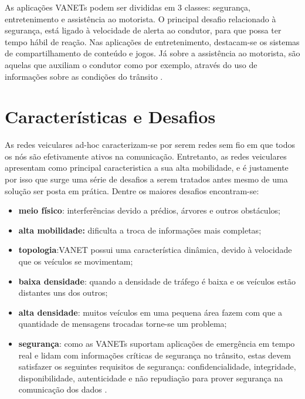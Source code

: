 \documentclass[
	12pt,				%
	oneside,			%
	a4paper,			%
	english,			%
	brazil				%
	]{abntex2ppgsi}
\begin{document}
As aplicações VANETs podem ser divididas em 3 classes: segurança, entretenimento e assistência ao motorista. O principal desafio relacionado à segurança, está ligado à velocidade de alerta ao condutor, para que possa ter tempo hábil de reação. Nas aplicações de entretenimento, destacam-se os sistemas de compartilhamento de conteúdo e jogos. Já sobre a assistência ao motorista, são aquelas que auxiliam o condutor como por exemplo, através do uso de informações sobre as condições do trânsito \cite{souzasoaressbrc}.

\section{Características e Desafios}


As redes veiculares ad-hoc caracterizam-se por serem redes sem fio em que todos os nós são efetivamente ativos na comunicação. Entretanto, as redes veiculares apresentam como principal caracteristica a sua alta mobilidade, e é justamente por isso que surge uma série de desafios a serem tratados antes mesmo de uma solução ser posta em prática. Dentre os maiores desafios encontram-se:

\begin{itemize}
	\item{\textbf{meio físico}: interferências devido a prédios,  árvores e outros obstáculos;}
	\item{\textbf{alta mobilidade:} dificulta a troca de informações mais completas; }
	\item{\textbf{topologia}:VANET possui uma característica dinâmica, devido à velocidade que os veículos se movimentam;}	
	\item{\textbf{baixa densidade}: quando a densidade de tráfego é baixa e os veículos estão distantes uns dos outros;}
	\item{\textbf{alta densidade}: muitos veículos em uma pequena área fazem com que a quantidade de mensagens trocadas torne-se um problema;}
	\item{\textbf{segurança}: como as VANETs suportam aplicações de emergência em tempo real e lidam com informações	críticas de segurança no trânsito, estas devem satisfazer os seguintes requisitos de segurança: confidencialidade, integridade, disponibilidade, autenticidade e não repudiação para prover segurança na comunicação dos dados \cite{samara2010security} \cite{matos2013analise}.}
	
\end{itemize} 
\end{document}
